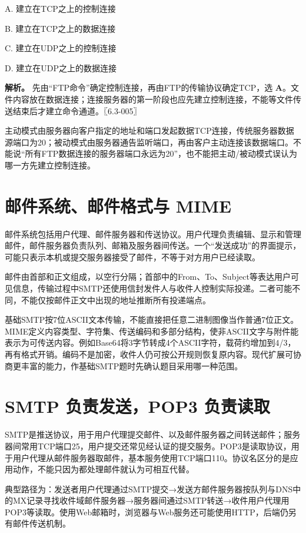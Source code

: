 A. 建立在TCP之上的控制连接

B. 建立在TCP之上的数据连接

C. 建立在UDP之上的控制连接

D. 建立在UDP之上的数据连接


\textbf{解析。} 先由``FTP命令''确定控制连接，再由FTP的传输协议确定TCP，选 \textbf{A}。文件内容放在数据连接；连接服务器的第一阶段也应先建立控制连接，不能等文件传送结束后才建立命令通道。〖6.3-005〗

主动模式由服务器向客户指定的地址和端口发起数据TCP连接，传统服务器数据源端口为20；被动模式由服务器通告监听端口，再由客户主动连接该数据端口。不能说``所有FTP数据连接的服务器端口永远为20''，也不能把主动/被动模式误认为哪一方先建立控制连接。

\section{邮件系统、邮件格式与 MIME}\label{cn-06-05}

邮件系统包括用户代理、邮件服务器和传送协议。用户代理负责编辑、显示和管理邮件，邮件服务器负责队列、邮箱及服务器间传送。一个``发送成功''的界面提示，可能只表示本机或提交服务器接受了邮件，不等于对方用户已经读取。

邮件由首部和正文组成，以空行分隔；首部中的From、To、Subject等表达用户可见信息，传输过程中SMTP还使用信封发件人与收件人控制实际投递。二者可能不同，不能仅按邮件正文中出现的地址推断所有投递端点。

基础SMTP按7位ASCII文本传输，不能直接把任意二进制图像当作普通7位正文。MIME定义内容类型、字符集、传送编码和多部分结构，使非ASCII文字与附件能表示为可传送内容。例如Base64将3字节转成4个ASCII字符，载荷约增加到4/3，再有格式开销。编码不是加密，收件人仍可按公开规则恢复原内容。现代扩展可协商更丰富的能力，作基础SMTP题时先确认题目采用哪一种范围。

\section{SMTP 负责发送，POP3 负责读取}\label{cn-06-06}

SMTP是推送协议，用于用户代理提交邮件、以及邮件服务器之间转送邮件；服务器间常用TCP端口25，用户提交还常见经认证的提交服务。POP3是读取协议，用于用户代理从邮件服务器取邮件，基本服务使用TCP端口110。协议名区分的是应用动作，不能只因为都处理邮件就认为可相互代替。

典型路径为：发送者用户代理通过SMTP提交→发送方邮件服务器按队列与DNS中的MX记录寻找收件域邮件服务器→服务器间通过SMTP转送→收件用户代理用POP3等读取。使用Web邮箱时，浏览器与Web服务还可能使用HTTP，后端仍另有邮件传送机制。

